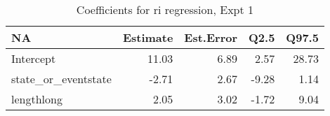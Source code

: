 \begin{table}[ht]
\centering
\begin{tabular}{lrrrr}
  \hline
NA & Estimate & Est.Error & Q2.5 & Q97.5 \\ 
  \hline
Intercept & 11.03 & 6.89 & 2.57 & 28.73 \\ 
  state\_or\_eventstate & -2.71 & 2.67 & -9.28 & 1.14 \\ 
  lengthlong & 2.05 & 3.02 & -1.72 & 9.04 \\ 
   \hline
\end{tabular}
\caption{Coefficients for ri regression, Expt 1} 
\end{table}
